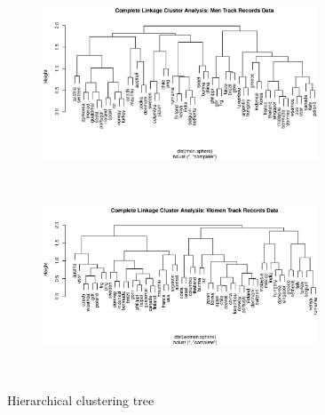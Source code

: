 \documentclass{article}
\begin{document}
\begin{itemize}[leftmargin = 0 em]
\begin{figure}[!htb]
          \begin{subfigure}[b]{\linewidth}
            \centering
            \includegraphics[width = 0.9\textwidth]{men_tree.eps}
            \caption{}
          \end{subfigure}%
          \\
          \begin{subfigure}[b]{\linewidth}
            \centering
            \includegraphics[width = 0.9\textwidth]{women_tree.eps}
            \caption{}\
          \end{subfigure}
          \caption{Hierarchical clustering tree}
          \label{tree}
\end{figure}


\end{itemize}
\end{document}
